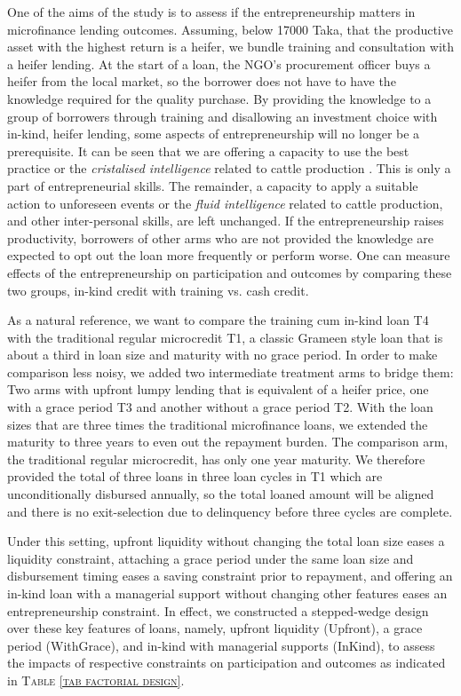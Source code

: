 	One of the aims of the study is to assess if the entrepreneurship matters in microfinance lending outcomes. Assuming, below 17000 Taka, that the productive asset with the highest return is a heifer, we bundle training and consultation with a heifer lending. At the start of a loan, the NGO's procurement officer buys a heifer from the local market, so the borrower does not have to have the knowledge required for the quality purchase. By providing the knowledge to a group of borrowers through training and disallowing an investment choice with in-kind, heifer lending, some aspects of entrepreneurship will no longer be a prerequisite. It can be seen that we are offering a capacity to use the best practice or the \textit{cristalised intelligence} related to cattle production \citep{Cattell1963}. This is only a part of entrepreneurial skills. The remainder, a capacity to apply a suitable action to unforeseen events or the \textit{fluid intelligence} related to cattle production, and other inter-personal skills, are left unchanged. If the entrepreneurship raises productivity, borrowers of other arms who are not provided the knowledge are expected to opt out the loan more frequently or perform worse. One can measure effects of the entrepreneurship on participation and outcomes by comparing these two groups, in-kind credit with training vs. cash credit.

	As a natural reference, we want to compare the training cum in-kind loan \textsf{T4} with the traditional regular microcredit \textsf{T1}, a classic Grameen style loan that is about a third in loan size and maturity with no grace period. In order to make comparison less noisy, we added two intermediate treatment arms to bridge them: Two arms with upfront lumpy lending that is equivalent of a heifer price, one with a grace period \textsf{T3} and another without a grace period \textsf{T2}. With the loan sizes that are three times the traditional microfinance loans, we extended the maturity to three years to even out the repayment burden. The comparison arm, the traditional regular microcredit, has only one year maturity. We therefore provided the total of three loans in three loan cycles in \textsf{T1} which are unconditionally disbursed annually, so the total loaned amount will be aligned and there is no exit-selection due to delinquency before three cycles are complete. 
	
	Under this setting, upfront liquidity without changing the total loan size eases a liquidity constraint, attaching a grace period under the same loan size and disbursement timing eases a saving constraint prior to repayment, and offering an in-kind loan with a managerial support without changing other features eases an entrepreneurship constraint. In effect, we constructed a stepped-wedge design over these key features of loans, namely, upfront liquidity (\textsf{Upfront}), a grace period (\textsf{WithGrace}), and in-kind with managerial supports (\textsf{InKind}), to assess the impacts of respective constraints on participation and outcomes as indicated in \textsc{\normalsize Table \ref{tab factorial design}}. 
	
